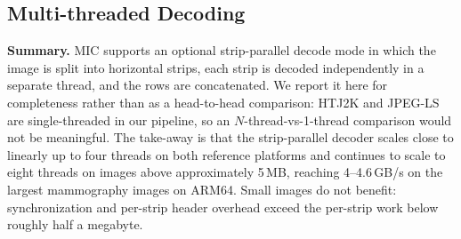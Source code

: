 \documentclass[journal]{IEEEtran}
\begin{document}
\subsection{Multi-threaded Decoding}
\label{subsec:multithread}

\textbf{Summary.} MIC supports an optional strip-parallel decode mode in
which the image is split into horizontal strips, each strip is decoded
independently in a separate thread, and the rows are concatenated. We
report it here for completeness rather than as a head-to-head comparison:
HTJ2K and JPEG-LS are single-threaded in our pipeline, so an
$N$-thread-vs-1-thread comparison would not be meaningful. The
take-away is that the strip-parallel decoder scales close to linearly
up to four threads on both reference platforms and continues to scale
to eight threads on images above approximately 5\,MB, reaching
4--4.6\,GB/s on the largest mammography images on ARM64. Small images
do not benefit: synchronization and per-strip header overhead exceed
the per-strip work below roughly half a megabyte.
\end{document}
